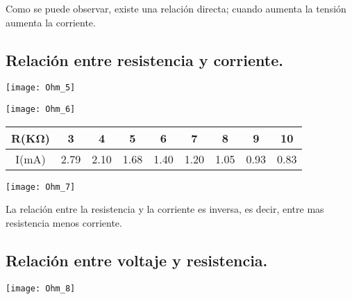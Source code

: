 \documentclass[11pt]{article}
\newenvironment{Figuras}
  {\par\medskip\noindent\minipage{\linewidth}}
  {\endminipage\par\medskip}
\begin{document}
\begin{multicols}{2}
		Como se puede observar, existe una relación directa; cuando aumenta la tensión aumenta la corriente.

	\subsection{Relación entre resistencia y corriente.}

		\begin{Figuras}
			\centering
		    \texttt{[image: Ohm\_5]}
		    \label{fig:mesh5}
		\end{Figuras}

		\begin{Figuras}
			\centering
		    \texttt{[image: Ohm\_6]}
		    \label{fig:mesh6}
		\end{Figuras}

		  \begin{tabular}{@{}ccccccccc@{}}
		    \toprule

		    R(KΩ)&		3&		4&		5&		6&		7&		8&		9&	10\\
		    \midrule
		    I(mA)&	2.79&	2.10&	1.68&	1.40&	1.20&	1.05&	0.93&	0.83\\

		    \bottomrule
		  \end{tabular}

		\begin{Figuras}
			\centering
		    \texttt{[image: Ohm\_7]}
		    \label{fig:mesh7}
		\end{Figuras}

		La relación entre la resistencia y la corriente es inversa, es decir, entre mas resistencia menos corriente.\newpage

	\subsection{Relación entre voltaje y resistencia.}

		\begin{Figuras}
			\centering
		    \texttt{[image: Ohm\_8]}
		    \label{fig:mesh8}
		\end{Figuras}



\end{multicols}
\end{document}
